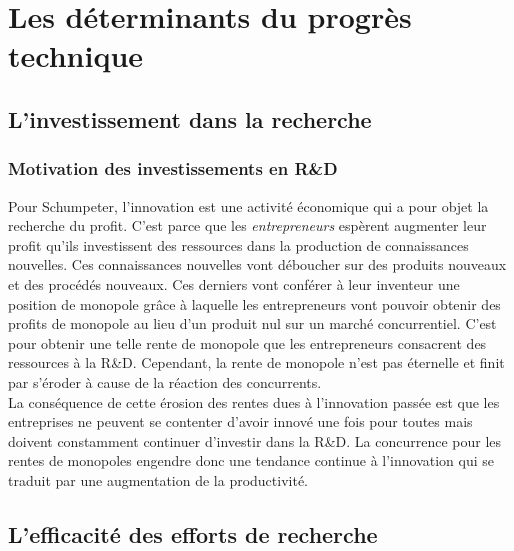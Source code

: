 \documentclass[10pt]{book}
\begin{document}
\section{Les déterminants du progrès technique}
\subsection{L'investissement dans la recherche}
\subsubsection{Motivation des investissements en R\&D}
Pour Schumpeter, l'innovation est une activité économique qui a pour objet la recherche du profit. C'est parce que les \textit{entrepreneurs} espèrent augmenter leur profit qu'ils investissent des ressources dans la production de connaissances nouvelles. Ces connaissances nouvelles vont déboucher sur des produits nouveaux et des procédés nouveaux. Ces derniers vont conférer à leur inventeur une position de monopole grâce à laquelle les entrepreneurs vont pouvoir obtenir des profits de monopole au lieu d'un produit nul sur un marché concurrentiel. C'est pour obtenir une telle rente de monopole que les entrepreneurs consacrent des ressources à la R\&D. Cependant, la rente de monopole n'est pas éternelle et finit par s'éroder à cause de la réaction des concurrents. \\
La conséquence de cette érosion des rentes dues à l'innovation passée est que les entreprises ne peuvent se contenter d'avoir innové une fois pour toutes mais doivent constamment continuer d'investir dans la R\&D. La concurrence pour les rentes de monopoles engendre donc une tendance continue à l'innovation qui se traduit par une augmentation de la productivité.
\subsection{L'efficacité des efforts de recherche}
\end{document}
